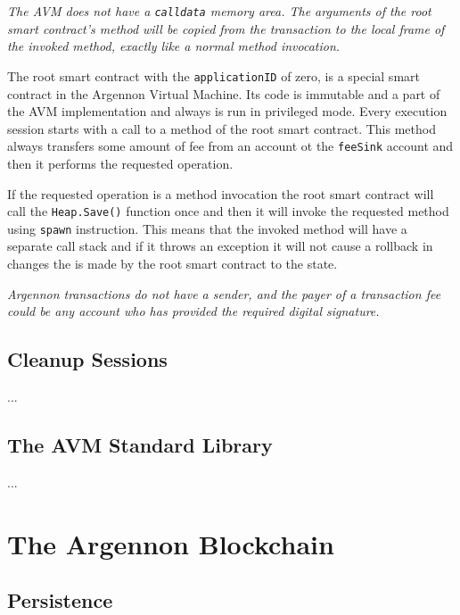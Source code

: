 \documentclass[11pt, a4paper]{report}
\newcommand{\note}[1] {
    \begin{tcolorbox}[colframe=white,colback=white]
        \emph{#1}
    \end{tcolorbox}
}
\begin{document}
    \note{The AVM does not have a \texttt{calldata} memory area. The arguments of the root smart contract's method will
    be copied from the transaction to the local frame of the invoked method, exactly like a normal method invocation.}

    The root smart contract with the \texttt{applicationID} of zero, is a special smart contract in the Argennon
    Virtual Machine. Its code is immutable and a part of the AVM implementation and always is run in privileged mode.
    Every execution session starts with a call to a method of the root smart contract. This method always transfers
    some amount of fee from an account ot the \texttt{feeSink} account and then it performs the requested operation.

    If the requested operation is a method invocation the root smart contract will call the \texttt{Heap.Save()}
    function once and then it will invoke the requested method using \texttt{spawn} instruction. This means that the
    invoked method will have a separate call stack and if it throws an exception it will not cause a rollback in
    changes the is made by the root smart contract to the state.

    \note{Argennon transactions do not have a sender, and the payer of a transaction fee could be any
    account who has provided the required digital signature.}

    \section{Cleanup Sessions}\label{sec:cleanup-sessions}



    ...


    \section{The AVM Standard Library}\label{sec:the-avm-standard-library}

    ...


    \chapter{The Argennon Blockchain}\label{ch:argennon-blockchain}


    \section{Persistence}\label{sec:persistence}
\end{document}
